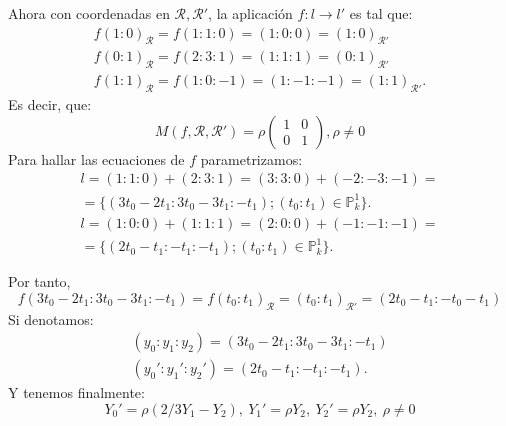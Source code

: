 \documentclass[10pt,a4paper,openright]{book}
\theoremstyle{break}
\begin{document}
Ahora con coordenadas en $\mathcal{R}, \mathcal{R}'$, la aplicación $f : l \rightarrow l'$ es tal que:
\begin{align*}
    f\left( 1 : 0 \right)_{\mathcal{R}} = f\left( 1 : 1 : 0 \right) = \left( 1 : 0 : 0 \right) = \left( 1 : 0 \right)_{\mathcal{R}'} \\
    f\left( 0 : 1 \right)_{\mathcal{R}} = f\left( 2 : 3 : 1 \right) = \left( 1 : 1 : 1 \right) = \left( 0 : 1 \right)_{\mathcal{R}'} \\
    f\left( 1 : 1 \right)_{\mathcal{R}} = f\left( 1 : 0 : -1 \right) = \left( 1 : -1 : -1 \right) = \left( 1 : 1 \right)_{\mathcal{R}'} 
.\end{align*}
Es decir, que:
\[
    M\left( f, \mathcal{R}, \mathcal{R}' \right) = \rho \begin{pmatrix} 1 & 0\\ 0 & 1 \end{pmatrix}, \rho \neq 0
\]
Para hallar las ecuaciones de $f$ parametrizamos:
\begin{align*}
    l = \left( 1 : 1 : 0 \right) + \left( 2 : 3 : 1 \right) = \left( 3 : 3 : 0 \right) + \left( -2 : -3 : -1 \right) = \\
= \{\left( 3t_0 - 2t_1 : 3t_0 - 3t_1 : -t_1 \right); \left( t_0 : t_1 \right) \in \mathbb{P}^{1}_{k}\} 
.\end{align*}
\begin{align*}
    l = \left( 1 : 0 : 0 \right) + \left( 1 : 1 : 1 \right) = \left( 2 : 0 : 0 \right) + \left( -1 : -1 : -1 \right) = \\
= \{\left( 2t_0 - t_1 : -t_1 : -t_1 \right); \left( t_0 : t_1 \right) \in \mathbb{P}^{1}_{k}\} 
.\end{align*}

Por tanto, 
\[
f\left( 3t_0 - 2t_1 : 3t_0 - 3t_1 : -t_1 \right) = f\left( t_0 : t_1 \right)_{\mathcal{R}} = \left( t_0 : t_1 \right)_{\mathcal{R}'} = \left( 2t_0 - t_1 : -t_0 - t_1 \right) 
\]
Si denotamos: 
\begin{align*}
    \left( y_0 : y_1 : y_2 \right) = \left( 3t_0 - 2t_1 : 3t_0 - 3t_1 : -t_1 \right)\\
    \left( y_0' : y_1' : y_2' \right) = \left( 2t_0 - t_1 : -t_1 : -t_1 \right)
.\end{align*}
Y tenemos finalmente:
\[
Y_0' = \rho\left( 2/3 Y_1 - Y_2 \right),\ Y_1' = \rho Y_2,\ Y_2' = \rho Y_2,\ \rho \neq 0
\]
\end{document}
